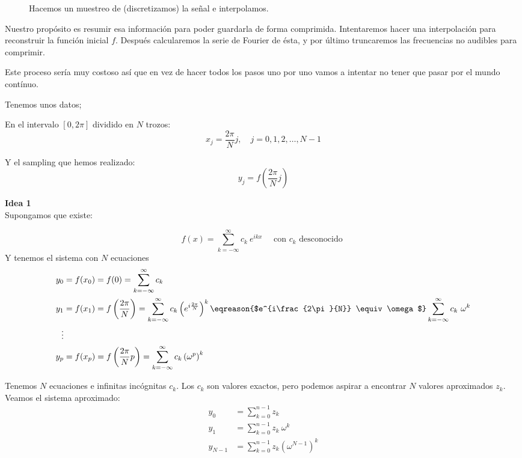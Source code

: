 			\begin{figure}[hbtp]
				\begin{minipage}[t]{.5\linewidth}
				\end{minipage}
				\begin{minipage}[t]{.5\linewidth}
				\end{minipage}
				\caption{ Hacemos un muestreo de (discretizamos) la señal e interpolamos. }
				\label{fig:DFT-Sampling}
			\end{figure}

			Nuestro propósito es resumir esa información para poder guardarla de forma comprimida. Intentaremos hacer una interpolación para reconstruir la función inicial $f$. Después calcularemos la serie de Fourier de ésta, y por último truncaremos las frecuencias no audibles para comprimir.

			Este proceso sería muy costoso así que en vez de hacer todos los pasos uno por uno vamos a intentar no tener que pasar por el mundo contínuo.

			Tenemos unos datos;

			En el intervalo $[0,2\pi]$ dividido en $N$ trozos:
			\[x_j = \frac{2\pi}{N}j, \quad j=0,1,2,…,N-1\]

			Y el sampling que hemos realizado:
			\[ y_j = f \left(\frac{2\pi}{N}j \right)\]


			\textbf{Idea 1}\\
			Supongamos que existe:

			\[f(x) = \sum_{k=-\infty}^\infty c_k \
			e^{ikx} \quad \text{ con } c_k \text{ desconocido } \]
			Y tenemos el sistema con $N$ ecuaciones
			\begin{align*}
				y_0 &= f(x_0) = f(0) = \sum_{k=-\infty}^\infty c_k \\
				y_1 &= f(x_1) = f\left(\frac{2\pi}{N}\right) = \sum_{k=-\infty}^\infty c_k \left( e^{i\frac{2\pi}{N}} \right)^k \eqreason{$e^{i\frac{2\pi}{N}} \equiv \omega $} \sum_{k=-\infty}^\infty c_k \ \omega^k \\
				\vdots \\
				y_p &= f(x_p) = f\left(\frac{2\pi}{N}p\right) = \sum_{k=-\infty}^\infty c_k \left(\omega^p\right)^k
			\end{align*}

			Tenemos $N$ ecuaciones e infinitas incógnitas $c_k$. Los $c_k$ son valores exactos, pero podemos aspirar a encontrar $N$ valores aproximados $z_k$. Veamos el sistema aproximado:
			\begin{align*}
				y_0 &= \sum_{k=0}^{n-1} z_k\\
				y_1 &= \sum_{k=0}^{n-1} z_k\ \omega^k\\
				y_{N-1} &= \sum_{k=0}^{n-1} z_k \left(\omega^{N-1}\right)^k
			\end{align*}



